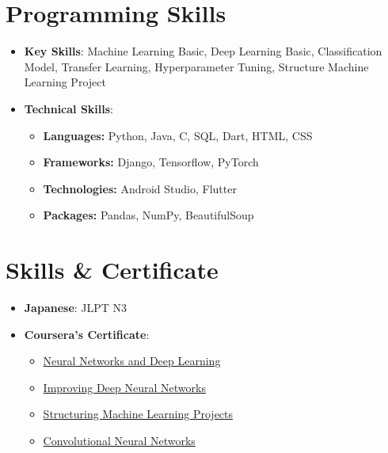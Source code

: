 \documentclass[letterpaper,11pt]{article}
\newcommand{\resumeSubHeadingListStart}{\begin{itemize}[leftmargin=*]}
\newcommand{\resumeSubHeadingListEnd}{\end{itemize}}
\begin{document}
%
\section{Programming Skills}
 \resumeSubHeadingListStart
   \item \textbf{Key Skills}{: Machine Learning Basic, Deep Learning Basic, Classification Model, Transfer Learning, Hyperparameter Tuning, Structure Machine Learning Project}
   \item \textbf{Technical Skills}{:}
    \begin{itemize}
   	 \item \textbf{Languages: }Python, Java, C, SQL, Dart, HTML, CSS
   	 \item \textbf{Frameworks: }Django, Tensorflow, PyTorch
   	 \item \textbf{Technologies: }Android Studio, Flutter
   	 \item \textbf{Packages: }Pandas, NumPy, BeautifulSoup
   	\end{itemize}
 \resumeSubHeadingListEnd


\section{Skills \& Certificate}
 \resumeSubHeadingListStart
   \item \textbf{Japanese}{: JLPT N3}
   \item \textbf{Coursera's Certificate}{: }
   	\begin{itemize}
   	 \item \href{https://www.coursera.org/account/accomplishments/verify/3SV6ZM83PAPY}{Neural Networks and Deep Learning}
   	 \item \href{https://www.coursera.org/account/accomplishments/verify/K7R7RXN6Q7SV}{Improving Deep Neural Networks}
   	 \item \href{https://www.coursera.org/account/accomplishments/verify/LDATR4NBCUGX}{Structuring Machine Learning Projects}
   	 \item \href{https://www.coursera.org/account/accomplishments/verify/V5T79CX4DHVH}{Convolutional Neural Networks}
   	\end{itemize}
 \resumeSubHeadingListEnd


\end{document}
